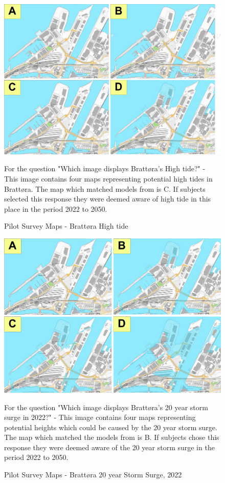 \begin{figure} [H]
    \centering
    \includegraphics[width=16cm]{fig/brattora question on 2022 high tide quadrant.png}
    \caption{Pilot Survey Maps - Brattøra High tide}{For the question "Which image displays Brattøra's High tide?" -  This image contains four maps representing potential high tides in Brattøra. The map which matched models from \cite{kartverket_se_2021} is C. If subjects selected this response they were deemed aware of high tide in this place in the period 2022 to 2050. }
    \label{fig:brattora_2022_hightide}
\end{figure}

\begin{figure}[H]
    \centering
    \includegraphics[width=16cm]{fig/brattora question on 2022 20 yr storm surge quadrant.png}
    \caption{Pilot Survey Maps - Brattøra 20 year Storm Surge, 2022}{For the question "Which image displays Brattøra's 20 year storm surge in 2022?" - This image contains four maps representing potential heights which could be caused by the 20 year storm surge. The map which matched the models from \cite{kartverket_se_2021} is B. If subjects chose this response they were deemed aware of the 20 year storm surge in the period 2022 to 2050.}
    \label{fig:brattora_2022_stormsurge}
\end{figure}

